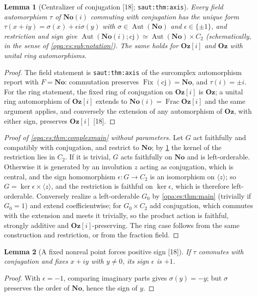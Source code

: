 \documentclass[11pt,oneside]{article}
\numberwithin{equation}{section}
\newtheorem{lemma}[lemma]{Lemma}
\theoremstyle{definition}
\theoremstyle{remark}
\newcommand{\No}{\mathbf{No}}
\newcommand{\Oz}{\mathbf{Oz}}
\newcommand{\Og}{\mathbf{Oz}[i]}
\newcommand{\SC}{\mathbf{No}(i)}
\newcommand{\Aut}{\operatorname{Aut}}
\newcommand{\Fix}{\operatorname{Fix}}
\newcommand{\Frac}{\operatorname{Frac}}
\newcommand{\src}[1]{\textup{\textsf{\small[#1]}}}
\newcommand{\lbl}[1]{\nolinkurl{#1}}
\begin{document}
\begin{lemma}[Centralizer of conjugation \src{18}; \lbl{saut:thm:axis}]\label{opa:es:lem:centralizer}
Every field automorphism $\tau$ of $\SC$ commuting with conjugation has the unique form $\tau(x+iy)=\sigma(x)+\epsilon i\sigma(y)$ with
$\sigma\in\Aut(\No)$ and $\epsilon\in\{\pm1\}$, and restriction and sign give $\Aut(\SC;\mathrm{cj})\simeq\Aut(\No)\times C_2$ (schematically, in
the sense of \cref{opa:es:sub:notation}). The same holds for $\Og$ and $\Oz$ with unital ring automorphisms.
\end{lemma}
\begin{proof}
The field statement is \lbl{saut:thm:axis} of the surcomplex automorphism report with $F=\No$: commutation preserves $\Fix(\mathrm{cj})=\No$,
and $\tau(i)=\pm i$. For the ring statement, the fixed ring of conjugation on $\Og$ is $\Oz$; a unital ring automorphism of $\Og$ extends to
$\SC=\Frac\Og$ and the same argument applies, and conversely the extension of any automorphism of $\Oz$, with either sign, preserves $\Og$
\src{18}.
\end{proof}

\begin{proof}[Proof of \cref{opa:es:thm:complexmain} without parameters]
Let $G$ act faithfully and compatibly with conjugation, and restrict to $\No$; by \cref{opa:es:lem:centralizer} the kernel of the restriction
lies in $C_2$. If it is trivial, $G$ acts faithfully on $\No$ and is left-orderable. Otherwise it is generated by an involution $z$ acting as
conjugation, which is central, and the sign homomorphism $\epsilon:G\to C_2$ is an isomorphism on $\langle z\rangle$; so
$G=\ker\epsilon\times\langle z\rangle$, and the restriction is faithful on $\ker\epsilon$, which is therefore left-orderable. Conversely realize a
left-orderable $G_0$ by \cref{opa:es:thm:main} (trivially if $G_0=1$) and extend coefficientwise; for $G_0\times C_2$ add conjugation, which
commutes with the extension and meets it trivially, so the product action is faithful, strongly additive and $\Og$-preserving. The ring case
follows from the same construction and restriction, or from the fraction field.
\end{proof}

\begin{lemma}[A fixed nonreal point forces positive sign \src{18}]\label{opa:es:lem:nonreal}
If $\tau$ commutes with conjugation and fixes $x+iy$ with $y\ne0$, its sign $\epsilon$ is $+1$.
\end{lemma}
\begin{proof}
With $\epsilon=-1$, comparing imaginary parts gives $\sigma(y)=-y$; but $\sigma$ preserves the order of $\No$, hence the sign of $y$.
\end{proof}
\end{document}
